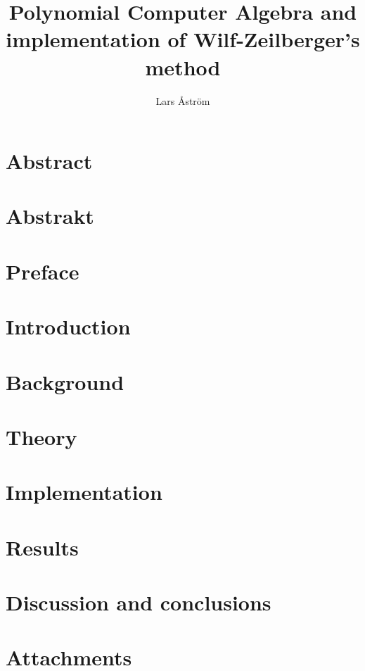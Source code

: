 \documentclass{LTHthesis}
\theoremstyle{definition}
\begin{document}
\begin{titlepages}
\author{Lars Åström}
\title{Polynomial Computer Algebra and implementation of Wilf-Zeilberger's method}
\end{titlepages}
\chapter*{Abstract}


\chapter*{Abstrakt}


\chapter*{Preface}


\tableofcontents

\chapter{Introduction}\label{Ch: Introduction}


\chapter{Background}\label{Ch: Background}


\chapter{Theory}\label{Ch: Theory}


\chapter{Implementation}\label{Ch: Implementation}


\chapter{Results}\label{Ch: Results}


\chapter{Discussion and conclusions}\label{Ch: Discussion and conclusions}


\begin{thebibliography}{99}

\end{thebibliography}

\chapter{Attachments}\label{Ch: Attachments}

\end{document}
